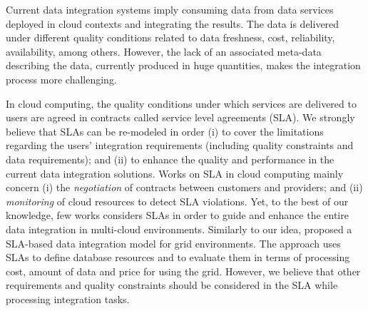 Current data integration systems imply consuming data from data services deployed in cloud contexts and integrating the results. The data is delivered under different quality conditions related to data freshness, cost, reliability, availability, among others. However, the lack of an associated meta-data describing the data, currently produced in huge quantities, makes the integration process more challenging.  

In cloud computing, the quality conditions under which services are delivered to users are agreed in contracts called service level agreements (SLA). We strongly believe that SLAs can be re-modeled in order (i) to cover the limitations regarding the users' integration requirements (including quality constraints and data requirements); and (ii) to enhance the quality and performance in the current data integration solutions. 
%
Works on SLA in cloud computing mainly concern (i) the \textit{negotiation} of contracts between customers and providers; and (ii) \textit{monitoring} of cloud resources to detect SLA violations.
Yet, to the best of our knowledge, few works considers SLAs in order to guide and enhance the entire data integration in multi-cloud environments.
Similarly to our idea, \cite{Nie07} proposed a SLA-based data integration model for grid environments. The approach uses SLAs to define database resources and to evaluate them in terms of processing cost, amount of data and price for using the grid. However, we believe that other requirements and quality constraints should be considered in the SLA while processing integration tasks.



